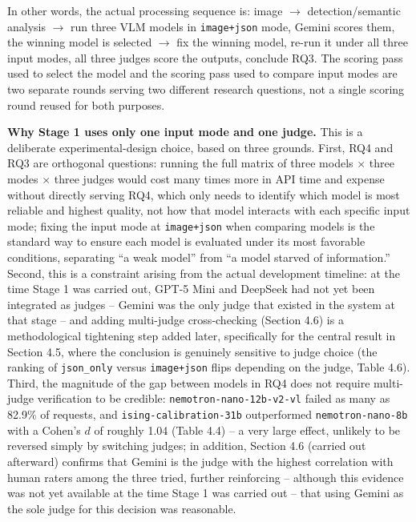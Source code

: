 \documentclass[12pt,a4paper]{report}
\begin{document}
In other words, the actual processing sequence is: image $\rightarrow$ detection/semantic analysis $\rightarrow$ run three VLM models in \texttt{image+json} mode, Gemini scores them, the winning model is selected $\rightarrow$ fix the winning model, re-run it under all three input modes, all three judges score the outputs, conclude RQ3. The scoring pass used to select the model and the scoring pass used to compare input modes are two separate rounds serving two different research questions, not a single scoring round reused for both purposes.

\textbf{Why Stage 1 uses only one input mode and one judge.} This is a deliberate experimental-design choice, based on three grounds. First, RQ4 and RQ3 are orthogonal questions: running the full matrix of three models $\times$ three modes $\times$ three judges would cost many times more in API time and expense without directly serving RQ4, which only needs to identify which model is most reliable and highest quality, not how that model interacts with each specific input mode; fixing the input mode at \texttt{image+json} when comparing models is the standard way to ensure each model is evaluated under its most favorable conditions, separating ``a weak model'' from ``a model starved of information.'' Second, this is a constraint arising from the actual development timeline: at the time Stage 1 was carried out, GPT-5 Mini and DeepSeek had not yet been integrated as judges -- Gemini was the only judge that existed in the system at that stage -- and adding multi-judge cross-checking (Section 4.6) is a methodological tightening step added later, specifically for the central result in Section 4.5, where the conclusion is genuinely sensitive to judge choice (the ranking of \texttt{json\_only} versus \texttt{image+json} flips depending on the judge, Table 4.6). Third, the magnitude of the gap between models in RQ4 does not require multi-judge verification to be credible: \texttt{nemotron-nano-12b-v2-vl} failed as many as 82.9\% of requests, and \texttt{ising-calibration-31b} outperformed \texttt{nemotron-nano-8b} with a Cohen's $d$ of roughly 1.04 (Table 4.4) -- a very large effect, unlikely to be reversed simply by switching judges; in addition, Section 4.6 (carried out afterward) confirms that Gemini is the judge with the highest correlation with human raters among the three tried, further reinforcing -- although this evidence was not yet available at the time Stage 1 was carried out -- that using Gemini as the sole judge for this decision was reasonable.
\end{document}
